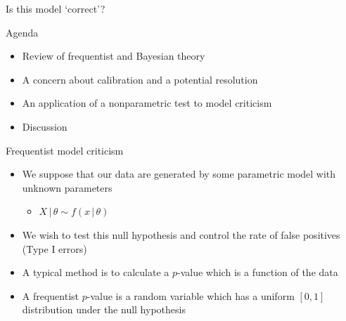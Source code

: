 \begin{frame}{Is this model `correct'?}
\begin{center}
  \end{center}
\end{frame}

\begin{frame}{Agenda}
  \begin{itemize}
    \item Review of frequentist and Bayesian theory
    \vspace{\baselineskip}
    \item A concern about calibration and a potential resolution
    \vspace{\baselineskip}
    \item An application of a nonparametric test to model criticism
    \vspace{\baselineskip}
    \item Discussion
  \end{itemize}
\end{frame}

\begin{frame}{Frequentist model criticism}
  \begin{itemize}
    \item We suppose that our data are generated by some parametric model with unknown parameters
    \begin{itemize}
      \item $X \,|\, \theta \sim f(x\,|\,\theta)$
    \end{itemize}
    \vspace{\baselineskip}
    \pause
    \item We wish to test this null hypothesis and control the rate of false positives (Type I errors)
    \vspace{\baselineskip}
    \pause
    \item A typical method is to calculate a $p$-value which is a function of the data
    \vspace{\baselineskip}
    \pause
    \item A frequentist $p$-value is a random variable which has a uniform $[0,1]$ distribution under the null hypothesis
  \end{itemize}
\end{frame}

